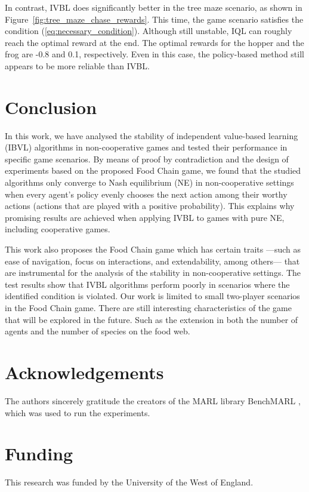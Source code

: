 \documentclass[]{interact}
\theoremstyle{plain}%
\theoremstyle{definition}
\theoremstyle{remark}
\begin{document}
In contrast, IVBL does significantly better in the tree maze scenario, as shown in Figure~\ref{fig:tree_maze_chase_rewards}. This time, the game scenario satisfies the condition (\ref{eq:necessary_condition}). Although still unstable, IQL can roughly reach the optimal reward at the end. The optimal rewards for the hopper and the frog are -0.8 and 0.1, respectively. Even in this case, the policy-based method still appears to be more reliable than IVBL.

\section{Conclusion}
In this work, we have analysed the stability of independent value-based learning (IBVL) algorithms in non-cooperative games and tested their performance in specific game scenarios. By means of proof by contradiction and the design of experiments based on the proposed Food Chain game, we found that the studied algorithms only converge to Nash equilibrium (NE) in non-cooperative settings when every agent's policy evenly chooses the next action among their worthy actions (actions that are played with a positive probability). This explains why promising results are achieved when applying IVBL to games with pure NE, including cooperative games.

This work also proposes the Food Chain game which has certain traits ---such as ease of navigation, focus on interactions, and extendability, among others--- that are instrumental for the analysis of the stability in non-cooperative settings. The test results show that IVBL algorithms perform poorly in scenarios where the identified condition is violated. Our work is limited to small two-player scenarios in the Food Chain game. There are still interesting characteristics of the game that will be explored in the future. Such as the extension in both the number of agents and the number of species on the food web.

\section*{Acknowledgements}
The authors sincerely gratitude the creators of the MARL library BenchMARL \cite{bettini2024benchmarl}, which was used to run the experiments.

\section*{Funding}
This research was funded by the University of the West of England.
\end{document}
